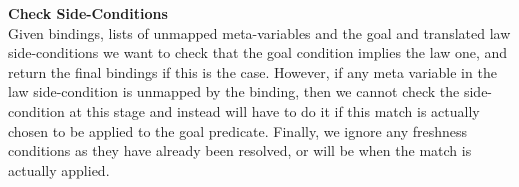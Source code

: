 \textbf{Check Side-Conditions}\\ %
Given bindings, lists of unmapped meta-variables
and the goal and translated law side-conditions
we want to check that the goal condition implies
the law one, and return the final bindings if this is the case.
However, if any meta variable in the law side-condition
is unmapped by the binding, then we cannot check the side-condition
at this stage and instead will have to do it if this match
is actually chosen to be applied to the goal predicate. Finally, we ignore any freshness conditions as they 
have already been resolved, or will be when the match is actually applied.